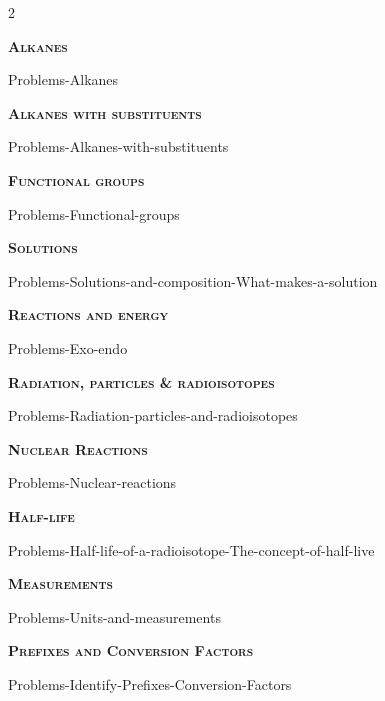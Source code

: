 \documentclass[main.tex]{subfiles}
\begin{document}
\newpage
\fancyhfoffset[E,O]{0pt}
\setlength{\columnsep}{30pt}
\begin{conclusion}
\end{conclusion}
\begin{multicols*}{2}\setcounter{numA}{1}  %







{\raggedright\textsc{\textbf{Alkanes}}\par}{Problems-Alkanes}
{\raggedright\textsc{\textbf{Alkanes with substituents}}\par}{Problems-Alkanes-with-substituents}
{\raggedright\textsc{\textbf{Functional groups}}\par}{Problems-Functional-groups}

{\raggedright\textsc{\textbf{Solutions}}\par}{Problems-Solutions-and-composition-What-makes-a-solution}


{\raggedright\textsc{\textbf{Reactions and energy	}}\par}{Problems-Exo-endo}
 {\raggedright\textsc{\textbf{Radiation, particles \& radioisotopes	}}\par}{Problems-Radiation-particles-and-radioisotopes		}
 {\raggedright\textsc{\textbf{Nuclear Reactions	}}\par}{Problems-Nuclear-reactions}
 {\raggedright\textsc{\textbf{Half-life	}}\par}{Problems-Half-life-of-a-radioisotope-The-concept-of-half-live}

{\raggedright\textsc{\textbf{Measurements}}\par}{Problems-Units-and-measurements}
{\raggedright\textsc{\textbf{ Prefixes and Conversion Factors}}\par}{Problems-Identify-Prefixes-Conversion-Factors}



 
 

\end{multicols*}
\end{document}
